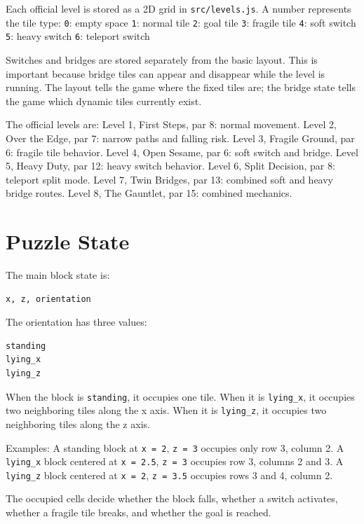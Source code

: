 \documentclass[11pt,a4paper]{article}
\newcommand{\code}[1]{\texttt{#1}}
\begin{document}
Each official level is stored as a 2D grid in \code{src/levels.js}. A number represents the tile type:
\code{0}: empty space
\code{1}: normal tile
\code{2}: goal tile
\code{3}: fragile tile
\code{4}: soft switch
\code{5}: heavy switch
\code{6}: teleport switch

Switches and bridges are stored separately from the basic layout. This is important because bridge tiles can appear and disappear while the level is running. The layout tells the game where the fixed tiles are; the bridge state tells the game which dynamic tiles currently exist.

The official levels are:
Level 1, First Steps, par 8: normal movement.
Level 2, Over the Edge, par 7: narrow paths and falling risk.
Level 3, Fragile Ground, par 6: fragile tile behavior.
Level 4, Open Sesame, par 6: soft switch and bridge.
Level 5, Heavy Duty, par 12: heavy switch behavior.
Level 6, Split Decision, par 8: teleport split mode.
Level 7, Twin Bridges, par 13: combined soft and heavy bridge routes.
Level 8, The Gauntlet, par 15: combined mechanics.

\section{Puzzle State}

The main block state is:

\begin{lstlisting}
x, z, orientation
\end{lstlisting}

The orientation has three values:

\begin{lstlisting}
standing
lying_x
lying_z
\end{lstlisting}

When the block is \code{standing}, it occupies one tile. When it is \code{lying\_x}, it occupies two neighboring tiles along the x axis. When it is \code{lying\_z}, it occupies two neighboring tiles along the z axis.

Examples:
A standing block at \code{x = 2}, \code{z = 3} occupies only row 3, column 2.
A \code{lying\_x} block centered at \code{x = 2.5}, \code{z = 3} occupies row 3, columns 2 and 3.
A \code{lying\_z} block centered at \code{x = 2}, \code{z = 3.5} occupies rows 3 and 4, column 2.

The occupied cells decide whether the block falls, whether a switch activates, whether a fragile tile breaks, and whether the goal is reached.
\end{document}

